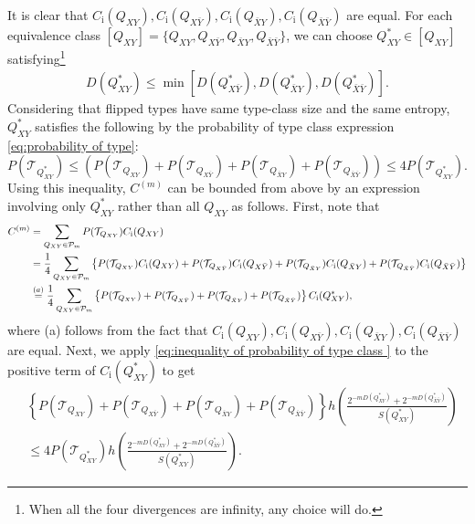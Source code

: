 \documentclass[journal,onecolumn]{IEEEtran}
\theoremstyle{definition}
\theoremstyle{remark}
\newcommand{\Qxy}{Q_{XY}}
\newcommand{\Qxby}{Q_{X\bar{Y}}}
\newcommand{\Qbxy}{Q_{\bar{X}Y}}
\newcommand{\Qbxby}{Q_{\bar{X}\bar{Y}}}
\newcommand{\Dxyas}{D(\Qxy^*)}
\newcommand{\Dbxbyas}{D(\Qbxby^*)}
\begin{document}
    It is clear that $C_{\mathrm{i}}(\Qxy),C_{\mathrm{i}}(\Qxby),C_{\mathrm{i}}(\Qbxy),C_{\mathrm{i}}(\Qbxby)$ are equal.
    For each equivalence class  $[\Qxy]=\{\Qxy,\Qxby,\Qbxy,\Qbxby\}$, we can choose $\Qxy^* \in [\Qxy]$ satisfying\footnote{
        When all the four divergences are infinity, any choice will do.
    }
    \begin{align*}
        D(\Qxy^*) \leq \min[D(\Qxby^*),D(\Qbxy^*),D(\Qbxby^*)].         
    \end{align*}
    Considering that flipped types have same type-class size and the same entropy, $\Qxy^*$ satisfies the following by the probability of type class expression \eqref{eq:probability of type}:
    \begin{equation}\label{eq:inequality of probability of type class }
        P(\mathcal{T}_{\Qxy^*})\leq \left(P(\mathcal{T}_{\Qxy})+P(\mathcal{T}_{\Qxby})+P(\mathcal{T}_{\Qbxy})+P(\mathcal{T}_{\Qbxby})\right)\leq 4P(\mathcal{T}_{\Qxy^*}).
    \end{equation} 
    Using this inequality, $C^{(m)}$ can be bounded from above by an expression involving only $\Qxy^*$ rather than all $\Qxy$ as follows.
    First, note that
    \begin{align}
        C^{(m)} &= \sum_{\Qxy \in \mathcal{P}_m} P(\mathcal{T}_{\Qxy}) C_{\mathrm{i}}(\Qxy)\notag\\ 
        &= \frac{1}{4}\sum_{\Qxy \in \mathcal{P}_m} \left\{P(\mathcal{T}_{\Qxy})C_{\mathrm{i}}(\Qxy)+P(\mathcal{T}_{\Qxby})C_{\mathrm{i}}(\Qxby)+P(\mathcal{T}_{\Qbxy})C_{\mathrm{i}}(\Qbxy)+P(\mathcal{T}_{\Qbxby})C_{\mathrm{i}}(\Qbxby)\right\}\notag\\
        &\overset{(a)}{=} \frac{1}{4}\sum_{\Qxy \in \mathcal{P}_m} \left\{P(\mathcal{T}_{\Qxy})+P(\mathcal{T}_{\Qxby})+P(\mathcal{T}_{\Qbxy})+P(\mathcal{T}_{\Qbxby})\right\} C_{\mathrm{i}}(\Qxy^*),\notag
    \end{align}
    where (a) follows from the fact that $C_{\mathrm{i}}(\Qxy),C_{\mathrm{i}}(\Qxby),C_{\mathrm{i}}(\Qbxy),C_{\mathrm{i}}(\Qbxby)$ are equal.
    Next, we apply \eqref{eq:inequality of probability of type class } to the positive term of $C_{\mathrm{i}}(\Qxy^*)$ to get
    \begin{align*}
        &\left\{P(\mathcal{T}_{\Qxy})+P(\mathcal{T}_{\Qxby})+P(\mathcal{T}_{\Qbxy})+P(\mathcal{T}_{\Qbxby}) \right\} h \left(\frac{2^{-m\Dxyas}+2^{-m\Dbxbyas}}{S(\Qxy^*)}\right)\\
        &\leq 4P(\mathcal{T}_{\Qxy^*}) h\left( \frac{2^{-m\Dxyas}+2^{-m\Dbxbyas}}{S(\Qxy^*)} \right).
    \end{align*}
\end{document}
